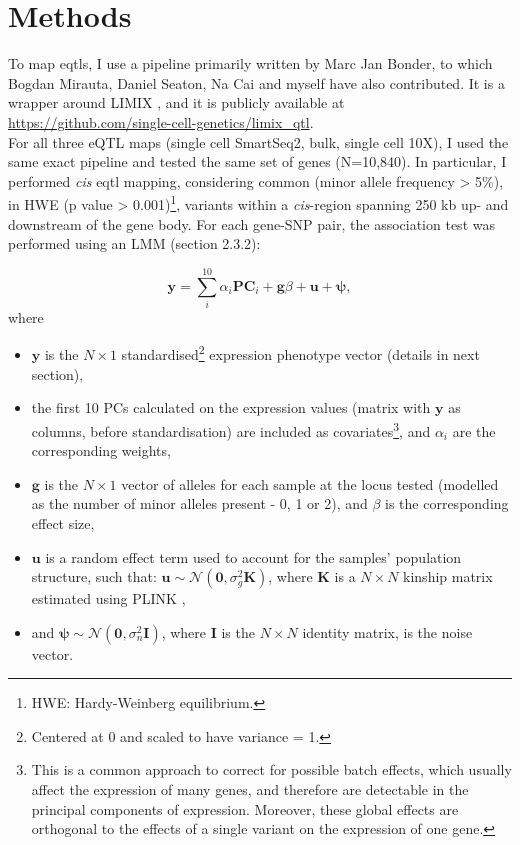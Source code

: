 \section{Methods}

To map \glspl{eqtl}, I use a pipeline primarily written by Marc Jan Bonder, to which Bogdan Mirauta, Daniel Seaton, Na Cai and myself have also contributed. 
It is a wrapper around LIMIX \cite{lippert2014limix, casale2015efficient}, and it is publicly available at \url{https://github.com/single-cell-genetics/limix_qtl}. \\

For all three eQTL maps (single cell SmartSeq2, bulk, single cell 10X), I used the same exact pipeline and tested the same set of genes (N=10,840).
In particular, I performed \textit{cis} \gls{eqtl} mapping, considering common (minor allele frequency > 5\%), in HWE (p value > 0.001)\footnote{HWE: Hardy-Weinberg equilibrium.}, variants within a \textit{cis}-region spanning 250 kb up- and downstream of the gene body.
For each gene-SNP pair, the association test was performed using an LMM (section
2.3.2):

\begin{equation}\label{eq:LMM_ipsc_eqtl}
    \mathbf{y} = \sum_i^{10}\alpha_i \mathbf{PC}_i + \mathbf{g}\beta + \mathbf{u} + \boldsymbol{\psi},  
\end{equation}
where 
\begin{itemize}
    \item $\mathbf{y}$ is the $N \times 1$ standardised\footnote{Centered at 0 and scaled to have variance = 1.} expression phenotype vector (details in next section),
    \item the first 10 PCs calculated on the expression values (matrix with $\mathbf{y}$ as columns, before standardisation) are included as covariates\footnote{This is a common approach to correct for possible batch effects, which usually affect the expression of many genes, and therefore are detectable in the principal components of expression. 
    Moreover, these global effects are orthogonal to the effects of a single variant on the expression of one gene.}, and $\alpha_i$ are the corresponding weights,
    \item $\mathbf{g}$ is the $N \times 1$ vector of alleles for each sample at the locus tested (modelled as the number of minor alleles present - 0, 1 or 2), and $\beta$ is the corresponding effect size,
    \item $\mathbf{u}$ is a random effect term used to account for the samples' population structure, such that: $\mathbf{u} \sim \mathcal{N}(\mathbf{0}, \sigma_g^2\mathbf{K})$, where $\mathbf{K}$ is a $N \times N$ kinship matrix estimated using PLINK \cite{purcell2007plink},
    \item and $\boldsymbol{\psi} \sim \mathcal{N}(\mathbf{0}, \sigma_n^2\mathbf{I})$, where $\mathbf{I}$ is the $N \times N$ identity matrix, is the noise vector.
\end{itemize}

